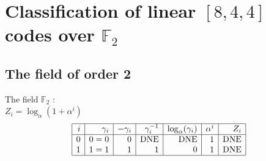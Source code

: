 
\section{Classification of linear $[8,4,4]$ codes over ${\mathbb F}_{2}$}
\label{app:codes844}


\subsection{The field of order 2}
\noindent The field ${\mathbb F}_{2}$ :\\
$Z_i = \log_\alpha (1 + \alpha^i)$\\
$$\begin{array}{|*{7}{r|}}
\hline
i & \gamma_i & -\gamma_i& \gamma_i^{-1}& \log_\alpha(\gamma_i)& \alpha^i& Z_i\\
\hline
  0 & 0 = 0 &0 & \mbox{DNE} & \mbox{DNE} &1 & \mbox{DNE}\\
  1 &   1 = 1 &1 &1 &0 &1 & \mbox{DNE}\\
\hline
\end{array}
$$
